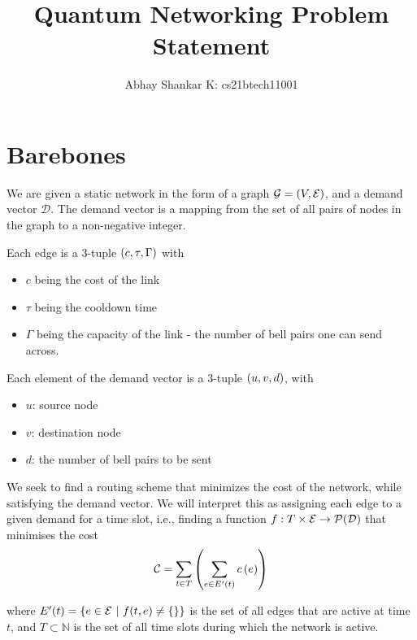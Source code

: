 \documentclass{amsart}
\begin{document}
    \title{Quantum Networking Problem Statement}
    \author{Abhay Shankar K: cs21btech11001}
    \maketitle

    \section{Barebones}

    We are given a static network in the form of a graph \(\mathcal{G} = \left(V, \mathcal{E}\right)\), and a demand vector \(\mathcal{D}\). The demand vector is a mapping from the set of all pairs of nodes in the graph to a non-negative integer. 

    Each edge is a 3-tuple \(\left(c, \tau, \Gamma\right)\) with \begin{itemize}
        \item \(c\) being the cost of the link
        \item \(\tau\) being the cooldown time
        \item \(\Gamma\) being the capacity of the link - the number of bell pairs one can send across.
    \end{itemize}

    Each element of the demand vector is a 3-tuple \(\left(u, v, d\right)\), with \begin{itemize}
        \item \(u\): source node
        \item \(v\): destination node
        \item \(d\): the number of bell pairs to be sent
    \end{itemize}

    We seek to find a routing scheme that minimizes the cost of the network, while satisfying the demand vector. We will interpret this as assigning each edge to a given demand for a time slot, i.e., finding a function \(f : T \times \mathcal{E} \rightarrow \mathcal{P}(\mathcal{D})\) that minimises the cost 
        \[\mathcal{C} = \sum_{t \in T} \left(\sum_{e \in E'(t)} c\left(e\right)\right)\]


    where \(E'(t) = \left\{e \in \mathcal{E} \ |\  f(t, e) \neq \{\} \right\}\) is the set of all edges that are active at time \(t\), and \(T \subset \mathbb{N}\) is the set of all time slots during which the network is active.
\end{document}
